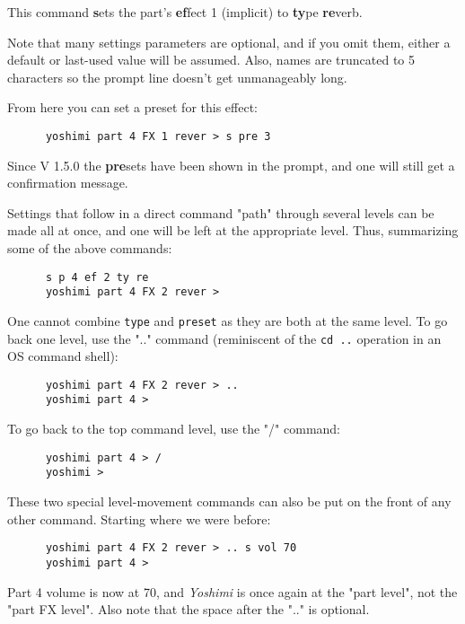    This command \textbf{s}ets the part's \textbf{ef}fect 1 (implicit) to
   \textbf{ty}pe \textbf{re}verb.

   Note that many settings parameters are optional, and if you omit them,
   either a default or last-used value will be assumed. Also, names are
   truncated to 5 characters so the prompt line doesn't get unmanageably long.

   From here you can set a preset for this effect:

   \begin{verbatim}
      yoshimi part 4 FX 1 rever > s pre 3
   \end{verbatim}

   Since V 1.5.0 the \textbf{pre}sets have been shown in the prompt, and one
   will still get a confirmation message.

   Settings that follow in a direct command "path" through several levels
   can be made all at once, and one will be left at the appropriate level.
   Thus, summarizing some of the above commands:

   \begin{verbatim}
      s p 4 ef 2 ty re
      yoshimi part 4 FX 2 rever >
   \end{verbatim}

   One cannot combine \texttt{type} and \texttt{preset} as they
   are both at the same level.  To go back one level, use the
   ".." command (reminiscent of the \texttt{cd ..} operation in an OS command
   shell):

   \begin{verbatim}
      yoshimi part 4 FX 2 rever > ..
      yoshimi part 4 >
   \end{verbatim}

   To go back to the top command level, use the "/" command:

   \begin{verbatim}
      yoshimi part 4 > /
      yoshimi >
   \end{verbatim}

   These two special level-movement commands can also be put on the front of
   any other command.  Starting where we were before:

   \begin{verbatim}
      yoshimi part 4 FX 2 rever > .. s vol 70
      yoshimi part 4 >
   \end{verbatim}

   Part 4 volume is now at 70, and \textsl{Yoshimi} is once again at the
   "part level", not the "part FX level".  Also note that the space after
   the ".." is optional.


